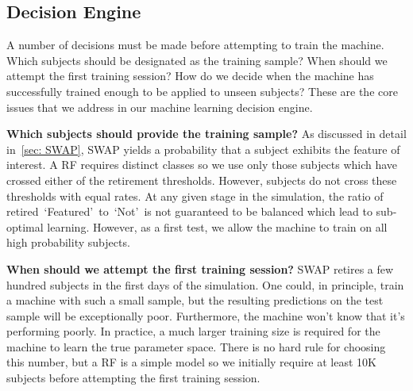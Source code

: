 \documentclass[twocolumn]{aastex6}
\newcommand{\feat}{`Featured'}
\newcommand{\notfeat}{`Not'}
\begin{document}

\subsection{Decision Engine}\label{sec: decision engine}
A number of decisions must be made before attempting to train the machine. 
Which subjects should be designated as the training sample? 
When should we attempt the first training session? 
How do we decide when the machine has successfully trained enough to be
applied to unseen subjects? These are the core issues that we address
in our machine learning decision engine.

\textbf{Which subjects should provide the training sample?} 
As discussed in detail in~\ref{sec: SWAP}, SWAP
yields a probability that a subject exhibits the feature of interest. A RF requires
distinct classes so we use only those subjects which have crossed either of the 
retirement thresholds. However, subjects do not cross these thresholds with equal rates. 
At any given stage in the simulation, the ratio of retired~\feat~to~\notfeat~is not
guaranteed to be balanced which lead to sub-optimal learning.
 However, as a first test, we allow the machine to train on all high probability subjects. 

\textbf{When should we attempt the first training session?}
SWAP retires a few hundred subjects in the first days of the simulation.
One could, in principle, train a machine with such a small sample, but the resulting
predictions on the test sample will be exceptionally poor. Furthermore, the machine
won't know that it's performing poorly. 
In practice, a much larger training size is required for the machine to learn the 
true parameter space. There is no hard rule for choosing this number, but a RF 
is a simple model so we initially require at least 10K subjects before attempting the first training session. 
\end{document}
